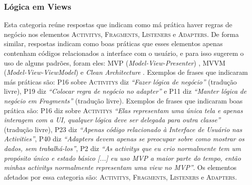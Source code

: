 
\subsubsection{L\'ogica em Views}
Esta categoria re\'une respostas que indicam como m\'a pr\'atica haver regras de neg\'ocio nos elementos \textsc{Activitys}, \textsc{Fragments}, \textsc{Listeners} e \textsc{Adapters}. De forma similar, respostas indicam como boas pr\'aticas que esses elementos apenas contenham c\'odigos relacionados a interface com o usu\'ario, e para isso sugerem o uso de alguns padr\~oes, foram eles: MVP (\textit{Model-View-Presenter}) \cite{MartinFowlerGUIArchitectures, WikipediaMVP}, MVVM (\textit{Model-View-ViewModel}) \cite{WikipediaMVVM} e \textit{Clean Architecture} \cite{CleanArchitecture}. Exemplos de frases que indicaram m\'as pr\'aticas s\~ao: P16 sobre \textsc{Activitys} diz \textit{``Fazer l\'ogica de neg\'ocio''} (tradu\c{c}\~ao livre), P19 diz \textit{``Colocar regra de neg\'ocio no adapter''} e P11 diz \textit{``Manter l\'ogica de neg\'ocio em Fragments''} (tradu\c{c}\~ao livre). Exemplos de frases que indicaram boas pr\'atica s\~ao: P16 diz sobre \textsc{Activitys} \textit{``Elas representam uma \'unica tela e apenas interagem com a UI, qualquer l\'ogica deve ser delegada para outra classe''} (tradu\c{c}\~ao livre), P23 diz \textit{``Apenas c\'odigo relacionado \`a Interface de Usu\'ario nas Activities''}, P40 diz \textit{``Adapters devem apenas se preocupar sobre como mostrar os dados, sem trabalh\'a-los''}, P2 diz \textit{``As activitys que eu crio normalmente tem um prop\'osito \'unico e estado b\'asico [...] eu uso MVP a maior parte do tempo, ent\~ao minhas activitys normalmente representam uma view no MVP''}. Os elementos afetados por essa categoria s\~ao: \textsc{Activitys}, \textsc{Fragments}, \textsc{Listeners} e \textsc{Adapters}. 

